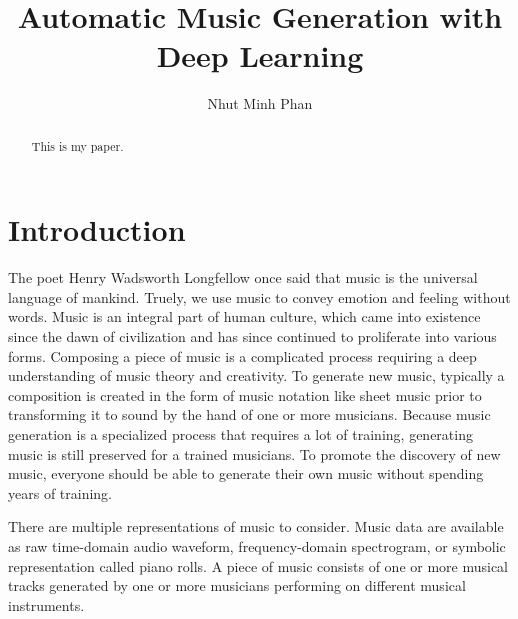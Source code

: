 \documentclass[sigconf,authorversion]{acmart}
\begin{document}
\renewcommand\footnotetextcopyrightpermission[1]{}
\pagestyle{plain}
\title{Automatic Music Generation with Deep Learning}

\author{Nhut Minh Phan}

\begin{abstract}
This is my paper.


\end{abstract}


\maketitle

\section{Introduction}

The poet Henry Wadsworth Longfellow once said that music is the universal 
language of mankind. Truely, we use music to convey emotion and feeling without
words. Music is an integral part of human culture, which
came into existence since the dawn of civilization and has since continued to 
proliferate into various forms. Composing a piece of music is a complicated process 
requiring a deep understanding of music theory and creativity. To 
generate new music, typically a composition is created in the form of music notation 
like sheet music prior to transforming it to sound by the hand of one or more musicians.
Because music generation is a specialized process that requires a lot of training,
generating music is still preserved for a trained musicians. To promote the discovery of 
new music, everyone should be able to generate their own music without spending
years of training. 

There are multiple representations of music to consider. Music data are available
as raw time-domain audio waveform, frequency-domain spectrogram, or symbolic
representation called piano rolls. A piece of music consists of one or more musical
tracks generated by one or more musicians performing on different musical
instruments.
\end{document}
